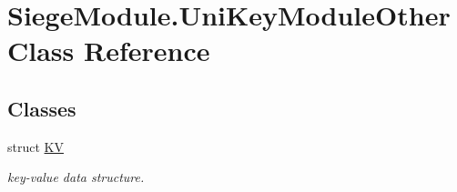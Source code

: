 \hypertarget{class_siege_module_1_1_uni_key_module_other}{}\section{Siege\+Module.\+Uni\+Key\+Module\+Other Class Reference}
\label{class_siege_module_1_1_uni_key_module_other}
\subsection*{Classes}
\begin{DoxyCompactItemize}
\item 
struct \mbox{\hyperlink{struct_siege_module_1_1_uni_key_module_other_1_1_k_v}{KV}}
\begin{DoxyCompactList}\small\item\em key-\/value data structure. \end{DoxyCompactList}\end{DoxyCompactItemize}
